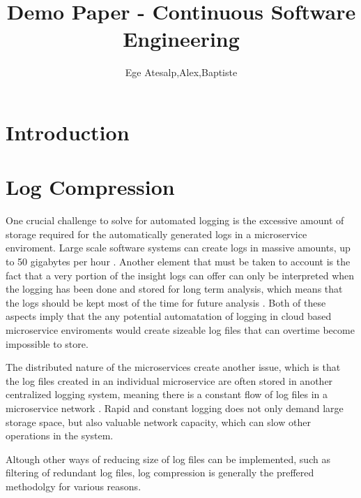 \documentclass[runningheads]{llncs}
\begin{document}
%
\title{Demo Paper - Continuous Software Engineering}

\author{Ege Atesalp,Alex,Baptiste}
%

%
\maketitle              %
%
\begin{abstract}


\end{abstract}

\section{Introduction}

\section{Log Compression}
One crucial challenge to solve for automated logging is the excessive amount of storage required for the automatically generated logs in a microservice enviroment. Large scale software systems can create logs in massive amounts, up to 50 gigabytes per hour \cite{SurveyAutomatedLogging}. Another element that must be taken to account is the fact that a very portion of the insight logs can offer can only be interpreted when the logging has been done and stored for long term analysis, which means that the logs should be kept most of the time for future analysis \cite{fastCompression}. Both of these aspects imply that the any potential automatation of logging in cloud based microservice enviroments would create sizeable log files that can overtime become impossible to store.

The distributed nature of the microservices create another issue, which is that the log files created in an individual microservice are often stored in another centralized logging system, meaning there is a constant flow of log files in a microservice network \cite{losslessCompression}. Rapid and constant logging does not only demand large storage space, but also valuable network capacity, which can slow other operations in the system.

Altough other ways of reducing size of log files can be implemented, such as filtering of redundant log files, log compression is generally the preffered methodolgy for various reasons\cite{losslessCompression}. 
\end{document}
